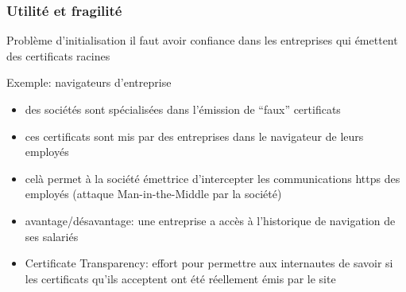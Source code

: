 \begin{reveals}
\begin{frame}
  \vfill
\end{frame}

\begin{frame}
  \frametitle{Utilité et fragilité}

  \vfill

   \begin{block}{Problème d'initialisation}
     il faut avoir confiance dans les entreprises qui émettent des
     certificats racines
   \end{block}

  \vfill
  \begin{block}{Exemple: navigateurs d'entreprise}
    \begin{itemize}
    \item des sociétés sont spécialisées dans l'émission de ``faux'' certificats
    \item ces certificats sont mis par des entreprises dans le
      navigateur de leurs employés
    \item celà permet à la société émettrice d'intercepter les
      communications https des employés (attaque Man-in-the-Middle par
      la société)
    \item avantage/désavantage: une entreprise a accès à l'historique
      de navigation de ses salariés 
    \item Certificate Transparency: effort pour permettre aux
      internautes de savoir si les certificats qu'ils acceptent ont
      été réellement émis par le site
    \end{itemize}
  \end{block}

  \vfill
\end{frame}



\end{reveals}

 
